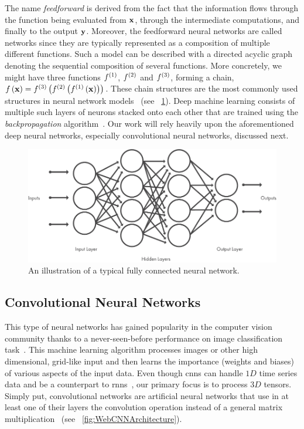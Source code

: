 The name \emph{feedforward} is derived from the fact that the information flows through the function being evaluated from ${\mathbf{x}}$, through the intermediate computations, and ﬁnally to the output ${\mathbf{y}}$. Moreover, the feedforward neural networks are called networks since they are typically represented as a composition of multiple different functions. Such a model can be described with a directed acyclic graph denoting the sequential composition of several functions. More concretely, we might have three functions ${f}^{\left( {1} \right)}$, ${f}^{\left( {2} \right)}$ and ${f}^{\left( {3} \right)}$, forming a chain, ${f} \left( {\mathbf{x}} \right) = {{f}^{\left( {3} \right)}} \left( {{f}^{\left( {2} \right)}} \left( {{f}^{\left( {1} \right)}} \left( {\mathbf{x}} \right) \right) \right)$. These chain structures are the most commonly used structures in neural network models~\cite{goodfellow2016dl} (see \figstr{}~\ref{fig:WebFCArchitecture}). Deep machine learning consists of multiple such layers of neurons stacked onto each other that are trained using the \emph{backpropagation} algorithm~\cite{rumelhart1986backprop}. Our work will rely heavily upon the aforementioned deep neural networks, especially convolutional neural networks, discussed next.

\begin{figure}[t]
    \centerline{\includegraphics[width=0.7\linewidth]{figures/theoretical_foundations/typical_fcn_architecture.pdf}}
    \caption[A typical FC architecture]{An illustration of a typical fully connected neural network. }
    \label{fig:WebFCArchitecture}
\end{figure}

\subsection{Convolutional Neural Networks}
\label{ssec:ConvolutionalNeuralNetworks}

This type of neural networks has gained popularity in the computer vision community thanks to a never-seen-before performance on image classification task~\cite{krizhevsky2012classification}. This machine learning algorithm processes images or other high dimensional, grid-like input and then learns the importance (weights and biases) of various aspects of the input data. Even though \glspl{cnn} can handle $1D$ time series data and be a counterpart to \glspl{rnn}~\cite{franoischollet2017learning}, our primary focus is to process $3D$ tensors. Simply put, convolutional networks are artificial neural networks that use in at least one of their layers the convolution operation instead of a general matrix multiplication~\cite{goodfellow2016dl} (see \figstr{}~\ref{fig:WebCNNArchitecture}).

